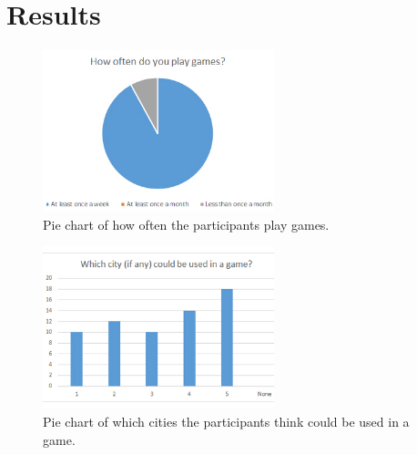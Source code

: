 \section{Results}

	\begin{figure}
		\centering
		\includegraphics[width=0.6\textwidth]{"Images/OftenPlay"}
		\caption{Pie chart of how often the participants play games.}
		\label{fig:pie-chart-often-play}
	\end{figure}

	\begin{figure}
		\centering
		\includegraphics[width=0.6\textwidth]{"Images/UseInGame"}
		\caption{Pie chart of which cities the participants think could be used in a game.}
		\label{fig:pie-chart-use-in-game}
	\end{figure}

